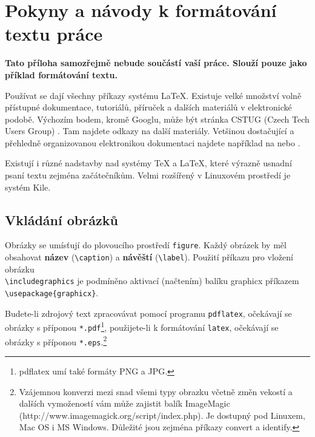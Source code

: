\documentclass[11pt,twoside,a4paper]{book}
\begin{document}
%

\appendix


\chapter{Pokyny a návody k formátování textu práce}
\textbf{\large Tato příloha samozřejmě nebude součástí vaší práce. Slouží pouze jako příklad formátování textu.}

Používat se dají všechny příkazy systému \LaTeX. Existuje velké množství volně přístupné dokumentace, tutoriálů, příruček a dalších materiálů v elektronické podobě. Výchozím bodem, kromě Googlu, může být stránka CSTUG (Czech Tech Users Group) \cite{CSTUG}. Tam najdete odkazy na další materiály.  Vetšinou dostačující a přehledně organizovanou elektronikou dokumentaci najdete například na \cite{latexdocweb} nebo \cite{latexwiki}.

Existují i různé nadstavby nad systémy \TeX{} a \LaTeX, které výrazně usnadní psaní textu zejména začátečníkům. Velmi rozšířený v Linuxovém prostředí je systém Kile.


\section{Vkládání obrázků}
Obrázky se umísťují do plovoucího prostředí \verb|figure|. Každý obrázek by měl obsahovat \textbf{název} (\verb|\caption|) a \textbf{návěští} (\verb|\label|). Použití příkazu pro vložení obrázku \\\verb|\includegraphics| je podmíněno aktivací (načtením) balíku graphicx příkazem\\ \verb|\usepackage{graphicx}|.

Budete-li zdrojový text zpracovávat pomocí programu \verb|pdflatex|, očekávají se obrázky s příponou \verb|*.pdf|\footnote{pdflatex umí také formáty PNG a JPG.}, použijete-li k formátování \verb|latex|, očekávají se obrázky s příponou \verb|*.eps|.\footnote{Vzájemnou konverzi mezi snad všemi typy obrazku včetně změn vekostí a dalších vymožeností vám může zajistit balík ImageMagic  (http://www.imagemagick.org/script/index.php). Je dostupný pod Linuxem, Mac OS i MS Windows. Důležité jsou zejména příkazy convert a identify.}
\end{document}
